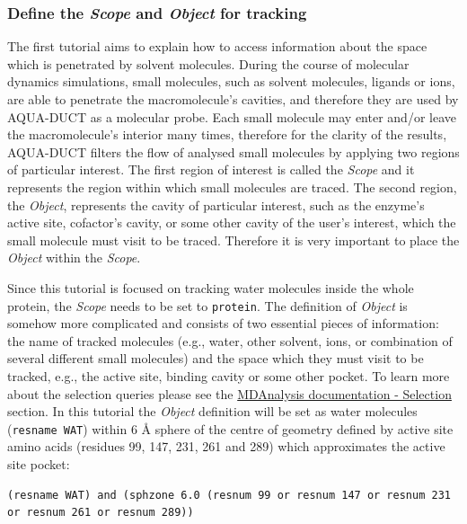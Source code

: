 \documentclass[9pt,tutorial]{livecoms}
\begin{document}
\subsubsection{Define the \emph{Scope} and \emph{Object} for tracking}
The first tutorial aims to explain how to access information about the space which is penetrated by solvent molecules. During the course of molecular dynamics simulations, small molecules, such as solvent molecules, ligands or ions, are able to penetrate the macromolecule's cavities, and therefore they are used by AQUA-DUCT as a molecular probe. Each small molecule may enter and/or leave the macromolecule's interior many times, therefore for the clarity of the results, AQUA-DUCT filters the flow of analysed small molecules by applying two regions of particular interest. The first region of interest is called the \emph{Scope} and it represents the region within which small molecules are traced. The second region, the \emph{Object}, represents the cavity of particular interest, such as the enzyme's active site, cofactor's cavity, or some other cavity of the user's interest, which the small molecule must visit to be traced. Therefore it is very important to place the \emph{Object} within the \emph{Scope}. 

Since this tutorial is focused on tracking water molecules inside the whole protein, the \textit{Scope} needs to be set to \texttt{protein}. The  definition  of \textit{Object} is somehow more complicated and consists of two essential pieces of information: the name of tracked molecules (e.g., water, other solvent, ions, or combination of several different small molecules) and the space which they must visit to be tracked, e.g., the active site, binding cavity or some other pocket. To learn more about the selection queries please see the \href{https://www.mdanalysis.org/docs/documentation_pages/selections.html}{MDAnalysis documentation - Selection} section. In this tutorial the \emph{Object} definition will be set as water molecules (\texttt{resname WAT}) within 6 Å sphere of the centre of geometry defined by active site amino acids (residues 99, 147, 231, 261 and 289) which approximates the active site pocket:
\begin{lstlisting}
(resname WAT) and (sphzone 6.0 (resnum 99 or resnum 147 or resnum 231 or resnum 261 or resnum 289))
\end{lstlisting}
\end{document}
